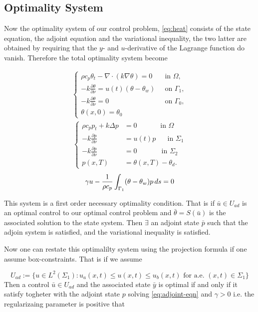\subsection{Optimality System}
Now the optimality system of our control problem, \eqref{eq:heat} consists of the state equation, the adjoint equation and the variational inequality, the two latter are obtained by requiring that the $y$- and $u$-derivative of the Lagrange function do vanish. Therefore the total optimality system become

\begin{align*}
    \begin{cases}
     \rho c_p \theta_t - \nabla \cdot (k \nabla \theta) = 0 \quad & \text{in $\Omega$}, \\
      -k \frac{\partial \theta}{\partial \nu} = u(t) (\theta - \theta_w) &\text{on } \Gamma_1, \\
      -k \frac{\partial \theta}{\partial \nu} = 0  &\text{on } \Gamma_0, \\
      \theta(x, 0) = \theta_0 
      \end{cases}
      \end{align*}
      \begin{align*}
      \begin{cases}
       \rho c_p p_t + k\Delta p &= 0 \quad\qquad\textrm{ in } \Omega \\
      -k\frac{\partial p}{\partial\nu} &= u(t)p \,\,\quad\textrm{ in } \Sigma_1 \\
      -k\frac{\partial p}{\partial\nu} &= 0 \,\quad\qquad\textrm{ in } \Sigma_2 \\
      p(x, T) &= \theta(x, T) - \theta_d.
      \end{cases}
      \end{align*}
\begin{equation*}
      \gamma u - \frac{1}{\rho c_p} \int_{\Gamma_1} (\theta - \theta_w)p \mathop{ds} = 0
\end{equation*}

This system is a first order necessary optimality condition. That is if $\bar{u} \in U_{ad}$ is an optimal control to our optimal control problem and $\bar{\theta} = S(\bar{u})$ is the associated solution to the state system. Then $\exists$ an adjoint state $\bar{p}$ such that the adjoin system is satisfied, and the variational inequality is satisfied. 

Now one can restate this optimalilty system using the projection formula if one assume box-constraints. That is if we assume

\begin{equation}
    \label{eq:box_constraints}
    U_{ad} := \{ u \in L^2(\Sigma_1): u_a(x,t) \leq u(x,t) \leq u_b(x,t) \text{ for a.e. } (x,t) \in \Sigma_1 \}
\end{equation}
Then a control $\bar{u} \in U_{ad}$ and the associated state $\bar{y}$ is optimal if and only if it satisfy togheter with the adjoint state $p$ solving \eqref{eq:adjoint-eqn}  and $\gamma >0$ i.e. the regularizaing parameter is positive that
